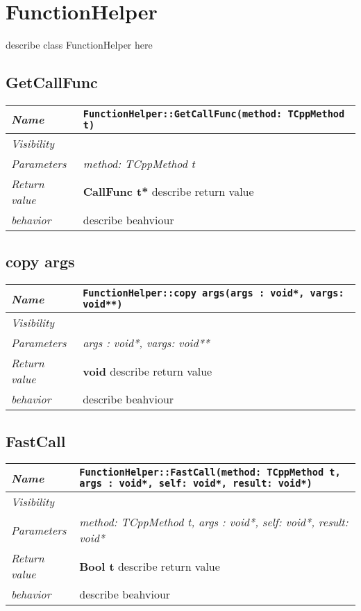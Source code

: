
 \chapter{FunctionHelper}
describe class FunctionHelper here
\section{GetCallFunc}
\begin{longtable}{p{3cm} @{\hskip 1cm} p{12cm}}
 \hline
\textit{Name} & \texttt{FunctionHelper::GetCallFunc(method: TCppMethod t)}\\
\hline
 \textit{Visibility} & \\
\hline
\textit{Parameters} & \textit{method: TCppMethod t}\\
\hline
\textit{Return value} & \textbf{ CallFunc t*} describe return value\\
  \hline
 \textit{behavior} & describe beahviour \\
\hline
\end{longtable} \pagebreak
 \section{copy args}
\begin{longtable}{p{3cm} @{\hskip 1cm} p{12cm}}
 \hline
\textit{Name} & \texttt{FunctionHelper::copy args(args : void*, vargs: void**)}\\
\hline
 \textit{Visibility} & \\
\hline
\textit{Parameters} & \textit{args : void*, vargs: void**}\\
\hline
\textit{Return value} & \textbf{ void} describe return value\\
  \hline
 \textit{behavior} & describe beahviour \\
\hline
\end{longtable} \pagebreak
 \section{FastCall}
\begin{longtable}{p{3cm} @{\hskip 1cm} p{12cm}}
 \hline
\textit{Name} & \texttt{FunctionHelper::FastCall(method: TCppMethod t, args : void*, self: void*, result: void*)}\\
\hline
 \textit{Visibility} & \\
\hline
\textit{Parameters} & \textit{method: TCppMethod t, args : void*, self: void*, result: void*}\\
\hline
\textit{Return value} & \textbf{ Bool t} describe return value\\
  \hline
 \textit{behavior} & describe beahviour \\
\hline
\end{longtable} \pagebreak
